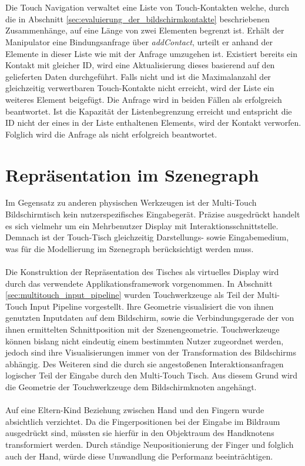 \\\\
Die Touch Navigation verwaltet eine Liste von Touch-Kontakten welche, durch die in Abschnitt \ref{sec:evaluierung_der_bildschirmkontakte} beschriebenen Zusammenhänge, auf eine Länge von zwei Elementen begrenzt ist. Erhält der Manipulator eine Bindungsanfrage über \emph{addContact}, urteilt er anhand der Elemente in dieser Liste wie mit der Anfrage umzugehen ist. Existiert bereits ein Kontakt mit gleicher ID, wird eine Aktualisierung dieses basierend auf den gelieferten Daten durchgeführt. Falls nicht und ist die Maximalanzahl der gleichzeitig verwertbaren Touch-Kontakte nicht erreicht, wird der Liste ein weiteres Element beigefügt. Die Anfrage wird in beiden Fällen als erfolgreich beantwortet. Ist die Kapazität der Listenbegrenzung erreicht und entspricht die ID nicht der eines in der Liste enthaltenen Elements, wird der Kontakt verworfen. Folglich wird die Anfrage als nicht erfolgreich beantwortet.


\section{Repräsentation im Szenegraph}
\label{sec:rep_im_szenegraph}

Im Gegensatz zu anderen physischen Werkzeugen ist der Multi-Touch Bildschirmtisch kein nutzerspezifisches Eingabegerät. Präzise ausgedrückt handelt es sich vielmehr um ein Mehrbenutzer Display mit Interaktionsschnittstelle. Demnach ist der Touch-Tisch gleichzeitig Darstellungs- sowie Eingabemedium, was für die Modellierung im Szenegraph berücksichtigt werden muss. 
\\\\
Die Konstruktion der Repräsentation des Tisches als virtuelles Display wird durch das verwendete Applikationsframework vorgenommen. In Abschnitt \ref{sec:multitouch_input_pipeline} wurden Touchwerkzeuge als Teil der Multi-Touch Input Pipeline vorgestellt. Ihre Geometrie visualisiert die  von ihnen genutzten Inputdaten auf dem Bildschirm, sowie die Verbindungsgerade der von ihnen ermittelten Schnittposition mit der Szenengeometrie. Touchwerkzeuge können bislang nicht eindeutig einem bestimmten Nutzer zugeordnet werden, jedoch sind ihre Visualisierungen immer von der Transformation des Bildschirms abhängig. Des Weiteren sind die durch sie angestoßenen Interaktionsanfragen logischer Teil der Eingabe durch den Multi-Touch Tisch. Aus diesem Grund wird die Geometrie der Touchwerkzeuge dem Bildschirmknoten angehängt.
\\\\
Auf eine Eltern-Kind Beziehung zwischen Hand und den Fingern wurde absichtlich verzichtet. Da die Fingerpositionen bei der Eingabe im Bildraum ausgedrückt sind, müssten sie hierfür in den Objektraum des Handknotens transformiert werden. Durch ständige Neupositionierung der Finger und folglich auch der Hand, würde diese Umwandlung die Performanz beeinträchtigen.


